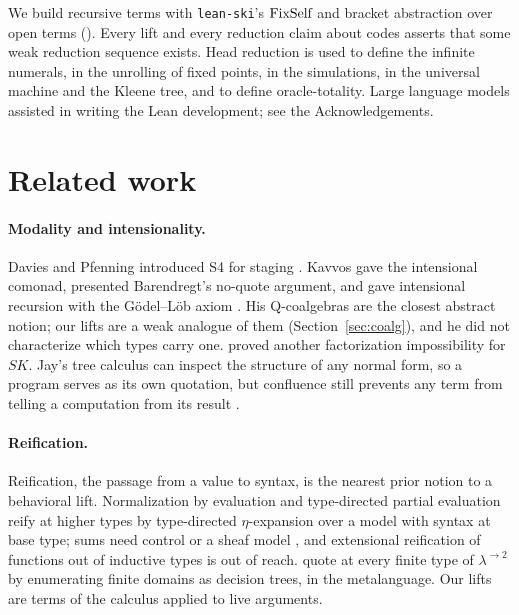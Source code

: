 \documentclass[acmsmall,review,screen]{acmart}\def\acmclass{}
\theoremstyle{plain}
\theoremstyle{definition}
\theoremstyle{remark}
\newcommand{\fn}[1]{\textup{#1}}  %
\begin{document}
We build recursive terms with \texttt{lean-ski}'s $\fn{FixSelf}$ and bracket
abstraction over open terms ().  Every lift and every reduction claim about codes asserts that some weak reduction
sequence exists.  Head reduction is used to define the infinite numerals, in the
unrolling of fixed points, in the simulations, in the universal machine and the Kleene
tree, and to define oracle-totality.  Large language models assisted in writing the Lean
development; see the Acknowledgements.

\section{Related work}\label{sec:related}
\paragraph{Modality and intensionality.}  Davies and Pfenning introduced S4 for staging
\citep{DaviesPfenning2001}.  Kavvos \citep{Kavvos2017,Kavvos2020} gave the intensional
comonad, presented Barendregt's no-quote argument, and gave intensional recursion with the
G\"odel--L\"ob axiom \citep{Kavvos2021}.  His Q-coalgebras \citep[Def.~33]{Kavvos2017}
are the closest abstract notion; our lifts are a weak analogue of them
(Section~\ref{sec:coalg}), and he did not characterize which types carry one.  \citet{JayGivenWilson2011} proved another factorization impossibility for $SK$.
Jay's tree calculus can inspect the structure of any normal form, so a program serves as its own quotation, but confluence still prevents any term from telling a computation from its result \citep{Jay2021}.
\paragraph{Reification.}  Reification, the passage from a value to syntax, is the nearest
prior notion to a behavioral lift.  Normalization by evaluation
\citep{BergerSchwichtenberg1991} and type-directed partial evaluation
\citep{Danvy1996} reify at higher types by type-directed $\eta$-expansion over a
model with syntax at base type; sums need control or a sheaf model
\citep{Danvy1996,ADHS2001}, and extensional reification of functions out of inductive
types is out of reach.
\citet{AltenkirchUustalu2004} quote at every finite type of $\lambda^{\to 2}$ by
enumerating finite domains as decision trees, in the metalanguage.  Our lifts are terms
of the calculus applied to live arguments.
\end{document}
